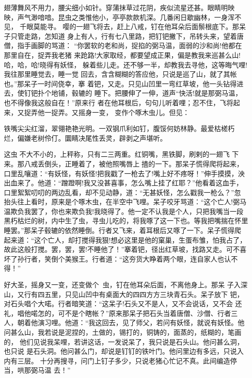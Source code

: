 翅薄舞风不用力，腰尖细小如针。穿蒲抹草过花阴，疾似流星还甚。眼睛明映
映，声气渺喑喑。昆虫之类惟他小，亭亭款款机深。几番闲日歇幽林，一身浑不见，
千眼莫能寻。
嘤的一翅飞将去，赶上八戒，钉在他耳朵后面鬃根底下。那呆子只管走路，怎知道
身上有人，行有七八里路，把钉钯撇下，吊转头来，望着唐僧，指手画脚的骂道：
“你罢软的老和尚，捉掐的弼马温，面弱的沙和尚!他都在那里自在，捉弄我老猪
来跄路!大家取经，都要望成正果，偏是教我来巡甚么山!哈，哈，哈!晓得有妖怪，
躲着些儿走。还不够一半，却教我去寻他，这等晦气哩!我往那里睡觉去，睡一觉
回去，含含糊糊的答应他，只说是巡了山，就了其帐也。”那呆子一时间侥幸，搴
着钯，又走。只见山凹里一弯红草坡，他一头钻得进去，使钉钯扑个地铺，毂辘的
睡下。把腰伸了一伸，道声“快活!就是那弼马温，也不得像我这般自在！”原来行
者在他耳根后，句句儿听着哩；忍不住，飞将起来，又捉弄他一捉弄。又摇身一变，
变作个啄木虫儿。但见：

铁嘴尖尖红溜，翠翎艳艳光明。一双钢爪利如钉，腹馁何妨林静。最爱枯槎朽
烂，偏嫌老树伶仃。圜睛决尾性丢灵，辟剥之声堪听。

这虫不大不小的，上秤称，只有二三两重。红铜嘴，黑铁脚，刷剌的一翅飞
下来。那八戒丢倒头，正睡着了，被他照嘴唇上揸的一下。那呆子慌得爬将起来，
口里乱嚷道：“有妖怪，有妖怪!把我戳了一枪去了!嘴上好不疼呀！”伸手摸摸，泱
出血来了。他道：“蹭蹬啊!我又没甚喜事，怎么嘴上挂了红耶？”他看着这血手，
口里絮絮叨叨的两边乱看，却不见动静，道：“无甚妖怪，怎么戳我一枪么？”忽
抬头往上看时，原来是个啄木虫，在半空中飞哩。呆子咬牙骂道：“这个亡人!弼马
温欺负我罢了，你也来欺负我!我晓得了。他一定不认我是个人，只把我嘴当一段
黑朽枯烂的树，内中生了虫，寻虫儿吃的，将我啄了这一下也。等我把嘴揣在怀里
睡罢。”那呆子毂辘的依然睡倒。行者又飞来，着耳根后又啄了一下。呆子慌得爬
起来道：“这个亡人，却打搅得我狠!想必这里是他的窠巢，生蛋布雏，怕我占了，
故此这般打搅。罢，罢，罢!不睡他了！”搴着钯，径出红草坡，找路又走。可不喜
坏了孙行者，笑倒个美猴王。行者道：“这夯货大睁着两个眼，连自家人也认不得！”

好大圣，摇身又一变，还变做个虫，钉在他耳朵后面，不离他身上。那呆
子入深山，又行有四五里，只见山凹中有桌面大的四四方方三块青石头。呆子放下
钯，对石头唱个大喏。行者暗笑道：“这呆子!石头又不是人，又不会说话，又不会
还礼，唱他喏怎的，可不是个瞎帐？”原来那呆子把石头当着唐僧、沙僧、行者三
人，朝着他演习哩。他道：“我这回去，见了师父，若问有妖怪，就说有妖怪。他
问甚么山，我若说是泥捏的，土做的，锡打的，铜铸的，面蒸的，纸糊的，笔画的，
他们见说我呆哩，若讲这话，一发说呆了，我只说是石头山。他问甚么洞，也只说
是石头洞。他问甚么门，却说是钉钉的铁叶门。他问里边有多远，只说入内有三层。
十分再搜寻，问门上钉子多少，只说老猪心忙记不真。此间编造停当，哄那弼马温
去！”

